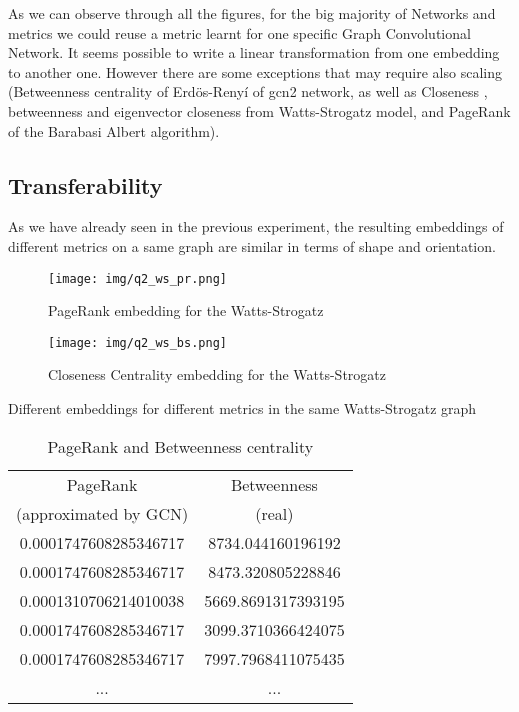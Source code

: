 \documentclass[a4paper]{article}
\begin{document}
As we can observe through all the figures, for the big majority of Networks and metrics we could reuse a metric learnt for one specific Graph Convolutional Network. It seems possible to write a linear transformation from one embedding to another one. However there are some exceptions that may require also scaling (Betweenness centrality of Erdös-Renyí of gcn2 network, as well as Closeness , betweenness and eigenvector closeness from Watts-Strogatz model, and PageRank of the Barabasi Albert algorithm). 

\subsection{Transferability}


As we have already seen in the previous experiment, the resulting embeddings of different metrics on a same graph are similar in terms of shape and orientation. 

\begin{figure}[H]
%
  \centering
    \texttt{[image: img/q2\_ws\_pr.png]}
    \caption{PageRank embedding for the Watts-Strogatz}
\endminipage
{}%
  \centering
    \texttt{[image: img/q2\_ws\_bs.png]}
    \caption{Closeness Centrality embedding for the Watts-Strogatz}
\endminipage
\end{figure}\caption{Different embeddings for different metrics in the same Watts-Strogatz graph}


\begin{table}[H]
\centering
\begin{tabular}{cc}
  \hline
 PageRank & Betweenness \\
 
 (approximated by GCN) & (real) \\
  \hline
  0.0001747608285346717 & 8734.044160196192 \\
  0.0001747608285346717 & 8473.320805228846  \\
  0.0001310706214010038 & 5669.8691317393195  \\
  0.0001747608285346717 & 3099.3710366424075 \\
  0.0001747608285346717 & 7997.7968411075435 \\
  ... & ... \\
  \hline
   
\end{tabular}\caption{PageRank and Betweenness centrality}\label{tab:results_prev}
\end{table}
\end{document}
